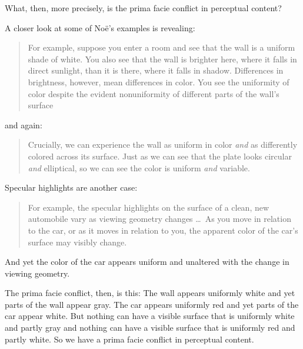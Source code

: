 \documentclass[12pt]{article}
\begin{document}
What, then, more precisely, is the prima facie conflict in perceptual content? 

A closer look at some of Noë's examples is revealing:
	\begin{quote}
		For example, suppose you enter a room and see that the wall is a uniform shade of white. You also see that the wall is brighter here, where it falls in direct sunlight, than it is there, where it falls in shadow. Differences in brightness, however, mean differences in color. You see the uniformity of color despite the evident nonuniformity of different parts of the wall's surface \citep[127]{Noe:2004fk}
	\end{quote}
and again:
	\begin{quote}
		Crucially, we can experience the wall as uniform in color \emph{and} as differently colored across its surface. Just as we can see that the plate looks circular \emph{and} elliptical, so we can see the color is uniform \emph{and} variable. \citep[129]{Noe:2004fk}
	\end{quote}

Specular highlights are another case:
	\begin{quote}
		For example, the specular highlights on the surface of a clean, new automobile vary as viewing geometry changes \ldots\ As you move in relation to the car, or as it moves in relation to you, the apparent color of the car's surface may visibly change. \citep[125]{Noe:2004fk}
	\end{quote}
And yet the color of the car appears uniform and unaltered with the change in viewing geometry.

The prima facie conflict, then, is this: The wall appears uniformly white and yet parts of the wall appear gray. The car appears uniformly red and yet parts of the car appear white. But nothing can have a visible surface that is uniformly white and partly gray and nothing can have a visible surface that is uniformly red and partly white. So we have a prima facie conflict in perceptual content.
\end{document}
